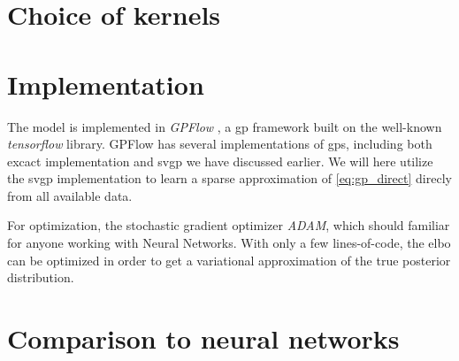 \section{Choice of kernels}

\section{Implementation}
The model is implemented in \textit{GPFlow} \cite{GPflow2017}, a \acrshort{gp} framework built on the well-known \textit{tensorflow} \cite{tensorflow2015-whitepaper} library. GPFlow has several implementations of \acrshort{gp}s, including both excact implementation and \acrshort{svgp} we have discussed earlier. We will here utilize the \acrshort{svgp} implementation to learn a sparse approximation of \cref{eq:gp_direct} direcly from all available data. 

For optimization, the stochastic gradient optimizer \textit{ADAM}, which should familiar for anyone working with Neural Networks. With only a few lines-of-code, the \acrshort{elbo} can be optimized in order to get a variational approximation of the true posterior distribution.

\section{Comparison to neural networks}


